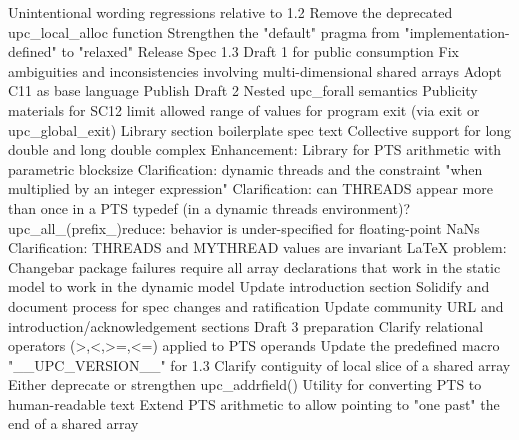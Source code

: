 {      \or %
        Unintentional wording regressions relative to 1.2
      \or %
        Remove the deprecated upc\_local\_alloc function
      \or %
        Strengthen the "default" pragma from "implementation-defined" to "relaxed"
      \or %
        Release Spec 1.3 Draft 1 for public consumption
      \or %
        Fix ambiguities and inconsistencies involving multi-dimensional shared arrays
      \or %
        Adopt C11 as base language
      \or %
        Publish Draft 2
      \or %
        Nested upc\_forall semantics
      \or %
        Publicity materials for SC12
      \or %
        limit allowed range of values for program exit (via exit or upc\_global\_exit)
      \or %
        Library section boilerplate spec text
      \or %
        Collective support for long double and long double complex
      \or %
        Enhancement: Library for PTS arithmetic with parametric blocksize
      \or %
        Clarification: dynamic threads and the constraint "when multiplied by an integer expression"
      \or %
        Clarification: can THREADS appear more than once in a PTS typedef (in a dynamic threads environment)?
      \or %
        upc\_all\_(prefix\_)reduce: behavior is under-specified for floating-point NaNs
      \or %
        Clarification: THREADS and MYTHREAD values are invariant
      \or %
        LaTeX problem: Changebar package failures
      \or %
        require all array declarations that work in the static model to work in the dynamic model
      \or %
        Update introduction section
      \or %
        Solidify and document process for spec changes and ratification
      \or %
        Update community URL and introduction/acknowledgement sections
      \or %
        Draft 3 preparation
      \or %
        Clarify relational operators (>,<,>=,<=) applied to PTS operands
      \or %
        Update the predefined macro "\_\_UPC\_VERSION\_\_" for 1.3
      \or %
        Clarify contiguity of local slice of a shared array
      \or %
        Either deprecate or strengthen upc\_addrfield()
      \or %
        Utility for converting PTS to human-readable text
      \or %
        Extend PTS arithmetic to allow pointing to "one past" the end of a shared array
    \else
        \empty
    \fi
}
